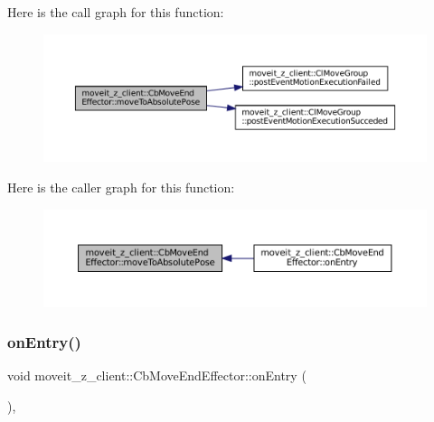Here is the call graph for this function\+:
\nopagebreak
\begin{figure}[H]
\begin{center}
\leavevmode
\includegraphics[width=350pt]{classmoveit__z__client_1_1CbMoveEndEffector_a277108330d114671ed89dffb876a8a48_cgraph}
\end{center}
\end{figure}
Here is the caller graph for this function\+:
\nopagebreak
\begin{figure}[H]
\begin{center}
\leavevmode
\includegraphics[width=350pt]{classmoveit__z__client_1_1CbMoveEndEffector_a277108330d114671ed89dffb876a8a48_icgraph}
\end{center}
\end{figure}
\mbox{\label{classmoveit__z__client_1_1CbMoveEndEffector_a5306018b432c9d8f8a31823f6b317d84}} 
\subsubsection{\texorpdfstring{on\+Entry()}{onEntry()}}
{\footnotesize\ttfamily void moveit\+\_\+z\+\_\+client\+::\+Cb\+Move\+End\+Effector\+::on\+Entry (\begin{DoxyParamCaption}{ }\end{DoxyParamCaption})\hspace{0.3cm}{\ttfamily [override]}, {\ttfamily [virtual]}}




